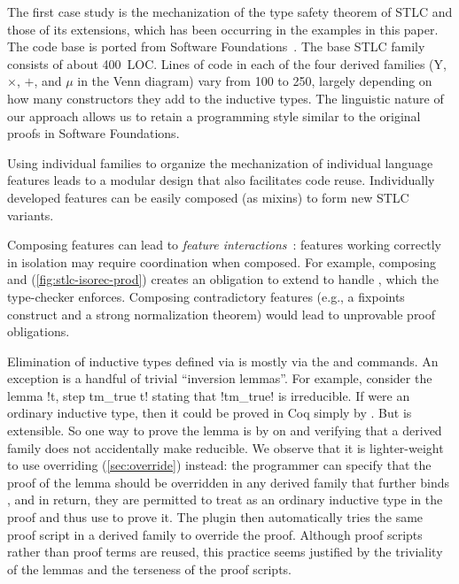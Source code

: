 



The first case study is the mechanization of the type safety theorem of
STLC and those of its extensions,
which has been occurring in the examples in this paper.
The code base is ported from Software Foundations~\cite{sf-pl}.
%
The base STLC family consists of about 400~LOC.
Lines of code in each of the four derived families
($\mathrm{Y}$, $\times$, $+$, and $\mu$ in the Venn diagram)
vary from 100 to 250, largely depending on how many constructors they
add to the inductive types.
%
The linguistic nature of our approach allows us to retain a programming
style similar to the original proofs in Software Foundations.



Using individual families to organize the mechanization of individual
language features leads to a modular design that also facilitates code reuse.
%
Individually developed features can be easily composed (as mixins) to
form new STLC variants.

Composing features can lead to \emph{feature interactions}~\cite{batory2011feature}:
features working correctly in isolation may require coordination when composed.
For example, composing  and 
(\cref{fig:stlc-isorec-prod}) creates an obligation to extend  to
handle , which the type-checker enforces.
%
Composing contradictory features (e.g., a fixpoints construct and a strong
normalization theorem) would lead to unprovable proof obligations.

Elimination of inductive types defined via  is
mostly via the  and  commands.
An exception is a handful of trivial ``inversion lemmas''.
For example, consider the lemma \lsti!\forall t, \neg step tm_true t!
stating that \lsti!tm_true! is irreducible.
If  were an ordinary inductive type, then it could be proved in Coq
simply by .
But  is extensible. So one way to prove the lemma is
by  on  and verifying that
a derived family does not accidentally make  reducible.
%
We observe that it is lighter-weight to use overriding (\cref{sec:override}) instead:
the programmer can specify that the proof of the lemma should be overridden
in any derived family that further binds ,
and in return, they are permitted to treat  as an ordinary
inductive type in the proof and thus use  to prove it.
The plugin then automatically tries the same proof script in a derived
family to override the proof. Although proof scripts rather
than proof terms are reused, this practice seems justified
by the triviality of the lemmas and the terseness of the proof scripts.

